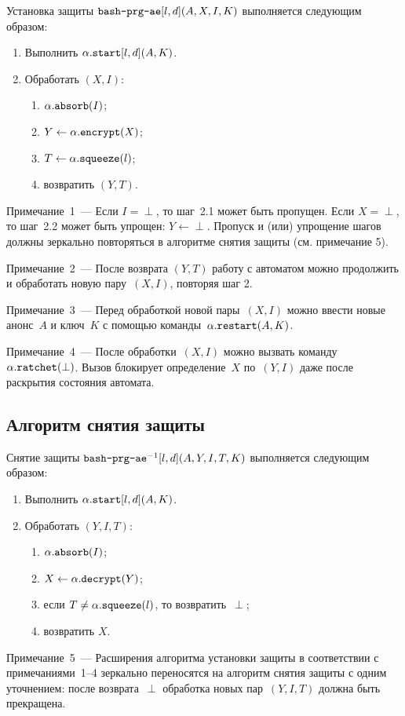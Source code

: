 Установка защиты $\texttt{bash-prg-ae}[l,d](A,X,I,K)$ выполняется следующим образом:
\begin{enumerate}
\item
Выполнить $\alpha.\texttt{start}[l,d](A,K)$.
\item
Обработать $(X,I)$:
\begin{enumerate}
\item
$\alpha.\texttt{absorb}(I)$;
\item
$Y\leftarrow\alpha.\texttt{encrypt}(X)$;
\item
$T\leftarrow \alpha.\texttt{squeeze}(l)$;
\item
возвратить $(Y,T)$.
\end{enumerate}
\end{enumerate}

\begin{note}
Примечание~1~--- 
Если $I=\perp$, то шаг~2.1 может быть пропущен.
%
Если $X=\perp$, то шаг~2.2 может быть упрощен: $Y\leftarrow\perp$.
%
Пропуск и (или) упрощение шагов должны зеркально повторяться в алгоритме снятия 
защиты (см. примечание 5).
\end{note}

\begin{note}
Примечание~2~--- После возврата $(Y,T)$ работу с автоматом
можно продолжить и обработать новую пару~$(X,I)$, повторяя шаг 2.
\end{note}

\begin{note}
Примечание~3~--- Перед обработкой новой пары~$(X,I)$ можно ввести
новые анонс~$A$ и ключ~$K$ с помощью 
команды~$\alpha.\texttt{restart}(A, K)$.
\end{note}

\begin{note}
Примечание~4~--- 
После обработки~$(X,I)$ можно вызвать 
команду~$\alpha.\texttt{ratchet}(\perp)$. Вызов блокирует  
определение~$X$ по~$(Y,I)$ даже после раскрытия состояния автомата. 
\end{note}

\subsection{Алгоритм снятия защиты}\label{PRG.AE.Unwrap}

Снятие защиты $\texttt{bash-prg-ae}^{-1}[l,d](A,Y,I,T,K)$ выполняется 
следующим образом:
\begin{enumerate}
\item
Выполнить $\alpha.\texttt{start}[l,d](A,K)$.
\item
Обработать $(Y,I,T)$:
\begin{enumerate}
\item
$\alpha.\texttt{absorb}(I)$;
\item
$X\leftarrow\alpha.\texttt{decrypt}(Y)$;
\item
если $T\neq\alpha.\texttt{squeeze}(l)$, то возвратить~$\perp$;
\item
возвратить $X$.
\end{enumerate}
\end{enumerate}

\begin{note}
Примечание~5~--- Расширения алгоритма установки защиты в соответствии 
с примечаниями~1--4 зеркально переносятся на алгоритм снятия защиты
с одним уточнением: после возврата~$\perp$ обработка новых пар~$(Y,I,T)$
должна быть прекращена.
\end{note}
